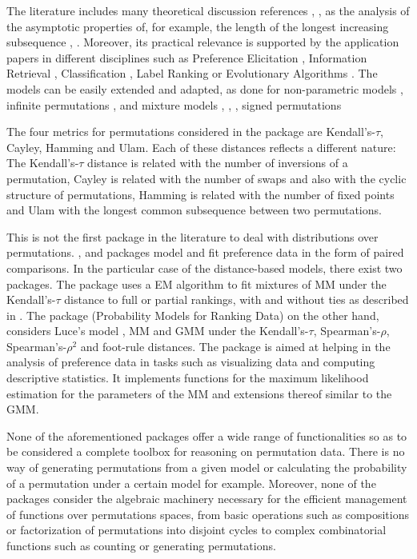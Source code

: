 \documentclass[article,nojss]{jss}
\begin{document}
The literature includes many theoretical discussion references \citep{Fligner1988}, \citep{critchlow91}, \citep{gMallows} as the analysis of the asymptotic properties of, for example, the length of the longest increasing subsequence \citep{Mueller2013}, \citep{feray2012}. Moreover, its practical relevance is supported by the application papers in different disciplines such as Preference Elicitation \citep{Chen04}, Information Retrieval \citep{farah}, Classification \citep{Cheng2009}, Label Ranking \citep{conf/isnn/ChengH09} or Evolutionary Algorithms \citep{cebe2011b}. The models can be easily extended and adapted, as done for non-parametric models \citep{Mao2008}, infinite permutations \citep{Gnedin2012615}, \citep{meila08}  and mixture models \citep{D'Elia2005917}, \citep{Meila2010}, \citep{Murphy2003645}, \citep{Lee20122486} signed permutations \citep{DBLP:conf/aistats/AroraM13}

The four metrics for permutations considered in the  package are Kendall's-$\tau$, Cayley, Hamming and Ulam. Each of these distances reflects a different nature: The Kendall's-$\tau$ distance is related with the number of inversions of a permutation, Cayley is related with the number of swaps and also with the cyclic structure of permutations, Hamming is related with the number of fixed points and Ulam with the longest common subsequence between two permutations. 

This is not the first package in the literature to deal with distributions over permutations.  \citep{BradleyTerry2},  \citep{bttree} and  packages \citep{prefmod} model and fit preference data in the form of paired comparisons. In the particular case of the distance-based models, there exist two packages. The  package uses a EM algorithm to fit mixtures of MM under the Kendall's-$\tau$ distance to full or partial rankings, with and without ties as described in \cite{Murphy2003645}. The  package (Probability Models for Ranking Data) \citep{Lee1013} on the other hand, considers Luce's model \citep{critchlow91}, MM and GMM under the Kendall's-$\tau$, Spearman's-$\rho$,  Spearman's-$\rho^2$  and foot-rule distances. The package is aimed at helping in the analysis of preference data in tasks such as visualizing data and computing descriptive statistics. It implements functions for the maximum likelihood estimation for the parameters of the MM and extensions thereof similar to the GMM.

None of the aforementioned packages offer a wide range of functionalities so as to be considered a complete toolbox for reasoning on permutation data. There is no way of generating permutations from a given model or calculating the probability of a permutation under a certain model for example. Moreover, none of the packages consider the algebraic machinery necessary for the efficient management of functions over permutations spaces, from basic operations such as compositions or factorization of permutations into disjoint cycles to complex combinatorial functions such as counting or generating permutations. 
\end{document}
